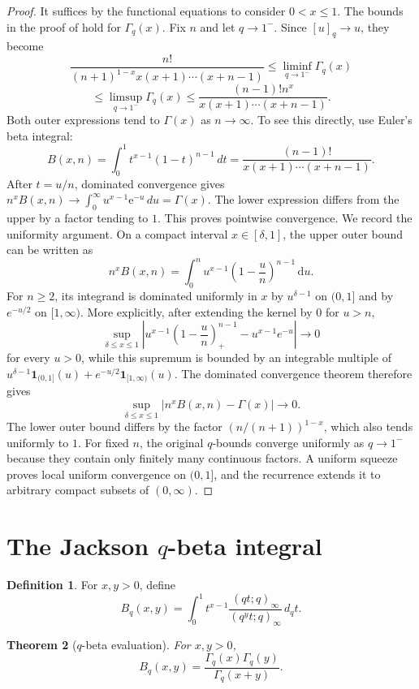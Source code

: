 \documentclass[11pt,oneside,openany]{book}
\newtheorem{theorem}{Theorem}[chapter]
\theoremstyle{definition}
\newtheorem{definition}[theorem]{Definition}
\theoremstyle{remark}
\newcommand{\e}{\mathrm e}
\newcommand{\dd}{\,\mathrm d}
\begin{document}
\begin{proof}
It suffices by the functional equations to consider $0<x\le1$.  The bounds in the proof of  hold for $\Gamma_q(x)$.  Fix $n$ and let $q\to1^-$.  Since $[u]_q\to u$, they become
\[
 \frac{n!}{(n+1)^{1-x}x(x+1)\cdots(x+n-1)}
 \le \liminf_{q\to1^-}\Gamma_q(x)
\]
\[
 \le\limsup_{q\to1^-}\Gamma_q(x)
 \le\frac{(n-1)!n^x}{x(x+1)\cdots(x+n-1)}.
\]
Both outer expressions tend to $\Gamma(x)$ as $n\to\infty$.  To see this directly, use Euler's beta integral:
\[
 B(x,n)=\int_0^1t^{x-1}(1-t)^{n-1}\,dt
 =\frac{(n-1)!}{x(x+1)\cdots(x+n-1)}.
\]
After $t=u/n$, dominated convergence gives $n^xB(x,n)\to\int_0^\infty u^{x-1}\e^{-u}\,du=\Gamma(x)$.  The lower expression differs from the upper by a factor tending to $1$.  This proves pointwise convergence.  We record the uniformity argument.  On a compact interval $x\in[\delta,1]$, the upper outer bound can be written as
\[
 n^xB(x,n)=\int_0^n u^{x-1}\left(1-\frac un\right)^{n-1}\dd u.
\]
For $n\ge2$, its integrand is dominated uniformly in $x$ by $u^{\delta-1}$ on $(0,1]$ and by $e^{-u/2}$ on $[1,\infty)$.  More explicitly, after extending the kernel by $0$ for $u>n$,
\[
 \sup_{\delta\le x\le1}
 \left|u^{x-1}\left(1-\frac un\right)_{+}^{n-1}
       -u^{x-1}e^{-u}\right|
 \longrightarrow0
\]
for every $u>0$, while this supremum is bounded by an integrable
multiple of $u^{\delta-1}\mathbf 1_{(0,1]}(u)+e^{-u/2}\mathbf 1_{[1,\infty)}(u)$.
The dominated convergence theorem therefore gives
\[
 \sup_{\delta\le x\le1}
 \left|n^xB(x,n)-\Gamma(x)\right|\longrightarrow0.
\]
The lower outer bound differs by the factor $(n/(n+1))^{1-x}$, which also tends uniformly to $1$.  For fixed $n$, the original $q$-bounds converge uniformly as $q\to1^-$ because they contain only finitely many continuous factors.  A uniform squeeze proves local uniform convergence on $(0,1]$, and the recurrence extends it to arbitrary compact subsets of $(0,\infty)$.
\end{proof}

\section{The Jackson \texorpdfstring{$q$}{q}-beta integral}

\begin{definition}
For $x,y>0$, define
\[
 B_q(x,y)=\int_0^1 t^{x-1}
 \frac{(qt;q)_\infty}{(q^yt;q)_\infty}\,d_qt.
\]
\end{definition}

\begin{theorem}[$q$-beta evaluation]\label{thm:qbeta}
For $x,y>0$,
\[
 B_q(x,y)=\frac{\Gamma_q(x)\Gamma_q(y)}{\Gamma_q(x+y)}.
\]
\end{theorem}
\end{document}
